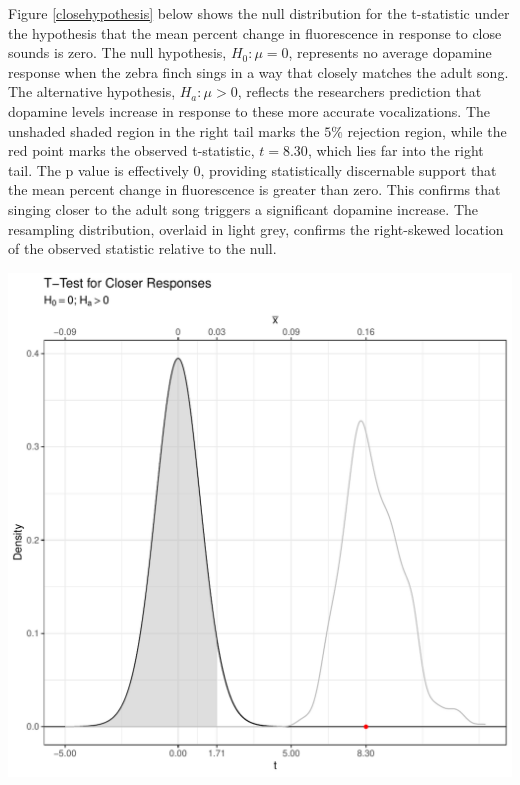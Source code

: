 \documentclass{article}\usepackage[]{graphicx}\usepackage[]{xcolor}
\makeatletter
\def\maxwidth{ %
  \ifdim\Gin@nat@width>\linewidth
    \linewidth
  \else
    \Gin@nat@width
  \fi
}
\newenvironment{knitrout}{}{} %
\makeatother
\begin{document}
\begin{enumerate}
\begin{enumerate}
Figure \ref{closehypothesis} below shows the null distribution for the t-statistic
under the hypothesis that the mean percent change in fluorescence in response to
close sounds is zero. The null hypothesis, $H_0: \mu = 0$, represents no average
dopamine response when the zebra finch sings in a way that closely matches the
adult song. The alternative hypothesis, $H_a: \mu > 0$, reflects the researchers
prediction that dopamine levels increase in response to these more accurate vocalizations.
The unshaded shaded region in the right tail marks the $5\%$ rejection region, while
the red point marks the observed t-statistic, $t=8.30$, which lies far into the 
right tail. The p value is effectively 0, providing
statistically discernable support that the mean percent change in fluorescence is greater
than zero. This confirms that singing closer to the adult song triggers a significant
dopamine increase. The resampling distribution, overlaid in light grey, confirms the
right-skewed location of the observed statistic relative to the null.

\begin{knitrout}\scriptsize
{}\color{fgcolor}
\includegraphics[width=\maxwidth]{figure/plot2-1} 
\end{knitrout}

\begin{figure}[H]
\begin{center}


\end{center}
\end{figure}
\end{enumerate}
\end{enumerate}
\end{document}
